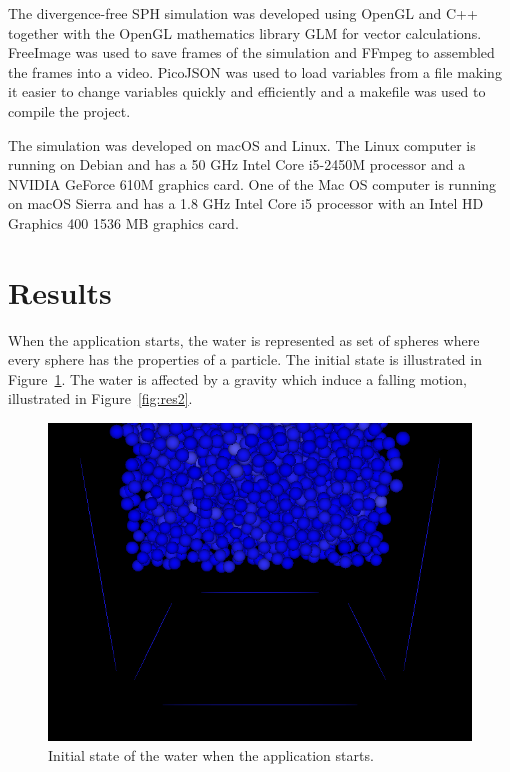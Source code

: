     The divergence-free SPH simulation was developed using OpenGL and C++ together with the OpenGL mathematics library GLM for vector calculations.
    FreeImage was used to save frames of the simulation and FFmpeg to assembled the frames into a video.
    PicoJSON was used to load variables from a file making it easier to change variables quickly and efficiently and a makefile was used to compile the project.

    The simulation was developed on macOS and Linux.
    The Linux computer is running on Debian and has a 50 GHz Intel Core i5-2450M processor and a NVIDIA GeForce 610M graphics card.
    One of the Mac OS computer is running on macOS Sierra and has a 1.8 GHz Intel Core i5 processor with an Intel HD Graphics 400 1536 MB graphics card.


\section{Results}

	When the application starts, the water is represented as set of spheres where every sphere has the properties of a particle.
	The initial state is illustrated in Figure~\ref{fig:res1}.
	The water is affected by a gravity which induce a falling motion, illustrated in Figure~\ref{fig:res2}.

	\begin{figure}[h!]
		\includegraphics[width=\linewidth]{img/frame0001.png}
		\caption{Initial state of the water when the application starts.}
		\label{fig:res1}
	\end{figure}


